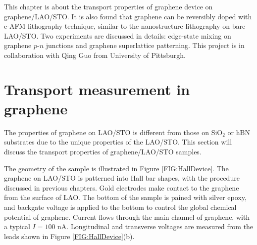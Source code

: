 \documentclass[pdflatex, sectionletters, 12pt]{pittetd}    %
\begin{document}
This chapter is about the transport properties of graphene device on graphene/LAO/STO. It is also found that graphene can be reversibly doped with c-AFM lithography technique, similar to the nanostructure lithography on bare LAO/STO. Two experiments are discussed in details: edge-state mixing on graphene $p$-$n$ junctions and graphene superlattice patterning. This project is in collaboration with Qing Guo from University of Pittsburgh.

\section{Transport measurement in graphene}

The properties of graphene on LAO/STO is different from those on SiO$_2$ or hBN substrates due to the unique properties of the LAO/STO. This section will discuss the transport properties of graphene/LAO/STO samples. 

The geometry of the sample is illustrated in Figure \ref{FIG:HallDevice}. The graphene on LAO/STO is patterned into Hall bar shapes, with the procedure discussed in previous chapters. Gold electrodes make contact to the graphene from the surface of LAO. The bottom of the sample is pained with silver epoxy, and backgate voltage is applied to the bottom to control the global chemical potential of graphene. Current flows through the main channel of graphene, with a typical $I = 100$ nA. Longitudinal and transverse voltages are measured from the leads shown in Figure \ref{FIG:HallDevice}(b).
\end{document}
